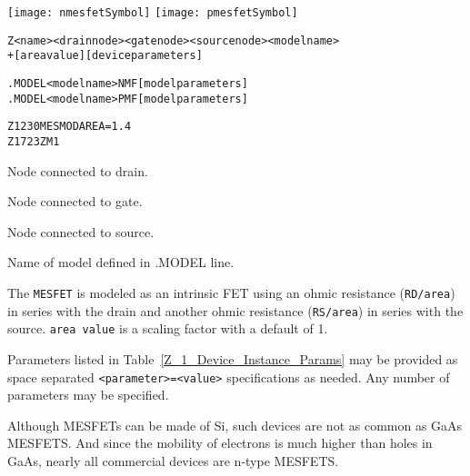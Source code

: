 


\begin{Device}\label{Z_DEVICE}

\symbol
{\texttt{[image: nmesfetSymbol]}}
{\texttt{[image: pmesfetSymbol]}}

\device
\begin{alltt}
Z<name> < drain node> <gate node> <source node> <model name>
+ [area value] [device parameters]
\end{alltt}

\model
\begin{alltt}
.MODEL <model name> NMF [model parameters]
.MODEL <model name> PMF [model parameters]
\end{alltt}

\examples
\begin{alltt}
Z1 2 3 0 MESMOD AREA=1.4
Z1 7 2 3 ZM1
\end{alltt}

\parameters

\begin{Parameters}

Node connected to drain.

Node connected to gate.

Node connected to source.

Name of model defined in .MODEL line.


The \texttt{MESFET} is modeled as an intrinsic FET using an ohmic
resistance (\texttt{RD/area}) in series with the drain and another ohmic
resistance (\texttt{RS/area}) in series with the source.  \texttt{area value}
is a scaling factor with a default of 1.


Parameters listed in Table~\ref{Z_1_Device_Instance_Params} may be
provided as space separated \texttt{<parameter>=<value>} specifications
as needed.  Any number of parameters may be specified.

\end{Parameters}

\comments

Although MESFETs can be made of Si, such devices are not as common as
GaAs MESFETS.  And since the mobility of electrons is much higher than
holes in GaAs, nearly all commercial devices are n-type MESFETS.

\end{Device}

